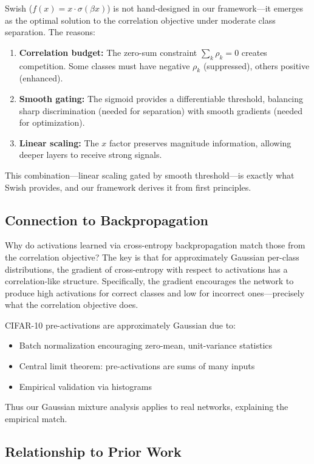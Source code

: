 \documentclass{article}
\begin{document}
Swish ($f(x) = x \cdot \sigma(\beta x)$) is not hand-designed in our framework—it emerges as the optimal solution to the correlation objective under moderate class separation. The reasons:

\begin{enumerate}
\item \textbf{Correlation budget:} The zero-sum constraint $\sum_k \rho_k = 0$ creates competition. Some classes must have negative $\rho_k$ (suppressed), others positive (enhanced).
\item \textbf{Smooth gating:} The sigmoid provides a differentiable threshold, balancing sharp discrimination (needed for separation) with smooth gradients (needed for optimization).
\item \textbf{Linear scaling:} The $x$ factor preserves magnitude information, allowing deeper layers to receive strong signals.
\end{enumerate}

This combination—linear scaling gated by smooth threshold—is exactly what Swish provides, and our framework derives it from first principles.

\subsection{Connection to Backpropagation}

Why do activations learned via cross-entropy backpropagation match those from the correlation objective? The key is that for approximately Gaussian per-class distributions, the gradient of cross-entropy with respect to activations has a correlation-like structure. Specifically, the gradient encourages the network to produce high activations for correct classes and low for incorrect ones—precisely what the correlation objective does.

CIFAR-10 pre-activations are approximately Gaussian due to:
\begin{itemize}
\item Batch normalization encouraging zero-mean, unit-variance statistics
\item Central limit theorem: pre-activations are sums of many inputs
\item Empirical validation via histograms
\end{itemize}

Thus our Gaussian mixture analysis applies to real networks, explaining the empirical match.

\subsection{Relationship to Prior Work}
\end{document}
